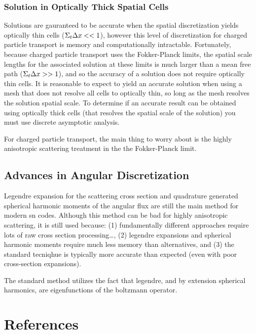 \subsubsection{Solution in Optically Thick Spatial Cells}
Solutions are gauranteed to be accurate when the spatial discretization yields optically thin cells ($\Sigma_{t}\Delta x<<1$), however this level of discretization for charged particle transport is memory and computationally intractable. Fortunately, because charged particle transport uses the Fokker-Planck limits, the spatial scale lengths for the associated solution at these limits is much larger than a mean free path ($\Sigma_{t}\Delta x >> 1$), and so the accuracy of a solution does not require optically thin cells. It is reasonable to expect to yield an accurate solution when using a mesh that does not resolve all cells to optically thin, so long as the mesh resolves the solution spatial scale. To determine if an accurate result can be obtained using optically thick cells (that resolves the spatial scale of the solution) you must use discrete asymptotic analysis. 

For charged particle transport, the main thing to worry about is the highly anisotropic scattering treatment in the the Fokker-Planck limit. 

\subsection{Advances in Angular Discretization}
Legendre expansion for the scattering cross section and quadrature generated spherical harmonic moments of the angular flux are still the main method for modern \gls{sn} codes. Although this method can be bad for highly anisotropic scattering, it is still used because: (1) fundamentally different approaches require lots of raw cross section processing\dots, (2) legendre expansions and spherical harmonic moments require much less memory than alternatives, and (3) the standard tecniqhue is typically more accurate than expected (even with poor cross-section expansions). 

The standard method utilizes the fact that legendre, and by extension spherical harmonics, are eigenfunctions of the boltzmann operator. 
\clearpage
{}
\section*{References}
\printbibliography[heading=none]

